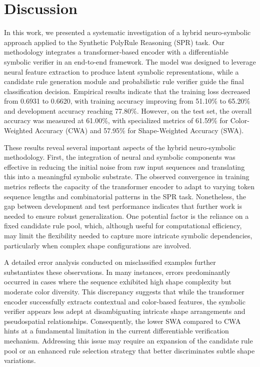 \documentclass{article}
\begin{document}
\section{Discussion}
In this work, we presented a systematic investigation of a hybrid neuro‐symbolic approach applied to the Synthetic PolyRule Reasoning (SPR) task. Our methodology integrates a transformer‐based encoder with a differentiable symbolic verifier in an end-to-end framework. The model was designed to leverage neural feature extraction to produce latent symbolic representations, while a candidate rule generation module and probabilistic rule verifier guide the final classification decision. Empirical results indicate that the training loss decreased from 0.6931 to 0.6620, with training accuracy improving from 51.10\% to 65.20\% and development accuracy reaching 77.80\%. However, on the test set, the overall accuracy was measured at 61.00\%, with specialized metrics of 61.59\% for Color-Weighted Accuracy (CWA) and 57.95\% for Shape-Weighted Accuracy (SWA).

These results reveal several important aspects of the hybrid neuro‐symbolic methodology. First, the integration of neural and symbolic components was effective in reducing the initial noise from raw input sequences and translating this into a meaningful symbolic substrate. The observed convergence in training metrics reflects the capacity of the transformer encoder to adapt to varying token sequence lengths and combinatorial patterns in the SPR task. Nonetheless, the gap between development and test performance indicates that further work is needed to ensure robust generalization. One potential factor is the reliance on a fixed candidate rule pool, which, although useful for computational efficiency, may limit the flexibility needed to capture more intricate symbolic dependencies, particularly when complex shape configurations are involved.

A detailed error analysis conducted on misclassified examples further substantiates these observations. In many instances, errors predominantly occurred in cases where the sequence exhibited high shape complexity but moderate color diversity. This discrepancy suggests that while the transformer encoder successfully extracts contextual and color-based features, the symbolic verifier appears less adept at disambiguating intricate shape arrangements and pseudospatial relationships. Consequently, the lower SWA compared to CWA hints at a fundamental limitation in the current differentiable verification mechanism. Addressing this issue may require an expansion of the candidate rule pool or an enhanced rule selection strategy that better discriminates subtle shape variations.
\end{document}
